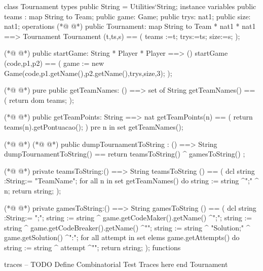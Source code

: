 \begin{vdmpp}[breaklines=true]
class Tournament
types
public String = Utilities`String;
instance variables
   public teams : map String to Team;   
   public game: Game;
   public trys: nat1;
   public size: nat1;
operations
(*@
\label{Tournament:10}
@*)
  public Tournament: map String to Team * nat1 * nat1 ==> Tournament
   Tournament (t,ts,s) == (
   teams :=t;
   trys:=ts;
   size:=s;
   );
   
(*@
\label{startGame:17}
@*)
   public startGame: String * Player * Player ==> ()
   startGame (code,p1,p2) == (
   game := new Game(code,p1.getName(),p2.getName(),trys,size,3);
   );
      
(*@
\label{getTeamNames:22}
@*)
   pure public getTeamNames: () ==> set of  String
   getTeamNames() == (
   return dom teams;
   );   

(*@
\label{getTeamPoints:27}
@*)
   public getTeamPoints:  String  ==> nat
   getTeamPoints(n) == ( 
   return teams(n).getPontuacao();   
   )
   pre n in set getTeamNames();
   
(*@
\label{dumpTournamentshipToString:33}
@*)
(*@
\label{dumpTournamentToString:33}
@*)
    public dumpTournamentToString : () ==> String
  dumpTournamentToString() ==
   return  teamsToString()  ^ gamesToString() ;
   
(*@
\label{teamsToString:37}
@*)
   private teamsToString:() ==> String
   teamsToString () == (
   dcl string :String:= "TeamName";
   for all n in set getTeamNames() do
   string :=  string ^";" ^ n;
   return string;
   );
   
(*@
\label{gamesToString:45}
@*)
   private gamesToString:() ==> String
   gamesToString () == (
   dcl string :String:= "\nPlayers;";
   string :=  string ^  game.getCodeMaker().getName() ^";";
   string := string ^ game.getCodeBreaker().getName() ^"\n";
   string := string ^ "Solution;" ^ game.getSolution() ^"\nAttempts:\n";
   for all attempt in set elems game.getAttempts() do
   string := string ^ attempt ^"\n";
   return string;
   );
functions
    
traces
-- TODO Define Combinatorial Test Traces here
end Tournament
\end{vdmpp}
